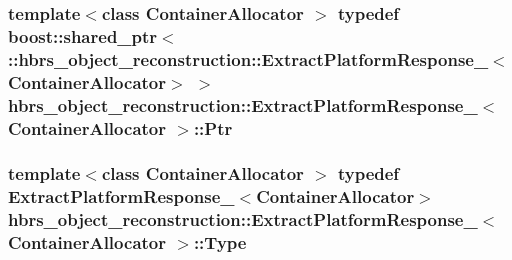 \hypertarget{structhbrs__object__reconstruction_1_1_extract_platform_response___af524f2e96f128cfbdf12eeb5337a01d1}{
\subsubsection[{\-Ptr}]{\setlength{\rightskip}{0pt plus 5cm}template$<$class Container\-Allocator $>$ typedef boost\-::shared\-\_\-ptr$<$ \-::{\bf hbrs\-\_\-object\-\_\-reconstruction\-::\-Extract\-Platform\-Response\-\_\-}$<$\-Container\-Allocator$>$ $>$ {\bf hbrs\-\_\-object\-\_\-reconstruction\-::\-Extract\-Platform\-Response\-\_\-}$<$ \-Container\-Allocator $>$\-::{\bf \-Ptr}}}\label{structhbrs__object__reconstruction_1_1_extract_platform_response___af524f2e96f128cfbdf12eeb5337a01d1}
\hypertarget{structhbrs__object__reconstruction_1_1_extract_platform_response___ad2f838a0a79227571b37da7f928e6b89}{
\subsubsection[{\-Type}]{\setlength{\rightskip}{0pt plus 5cm}template$<$class Container\-Allocator $>$ typedef {\bf \-Extract\-Platform\-Response\-\_\-}$<$\-Container\-Allocator$>$ {\bf hbrs\-\_\-object\-\_\-reconstruction\-::\-Extract\-Platform\-Response\-\_\-}$<$ \-Container\-Allocator $>$\-::{\bf \-Type}}}\label{structhbrs__object__reconstruction_1_1_extract_platform_response___ad2f838a0a79227571b37da7f928e6b89}



